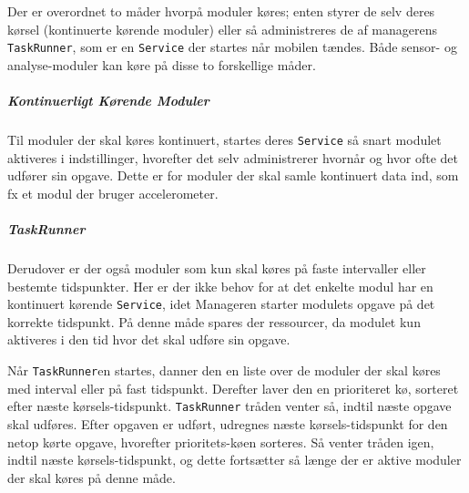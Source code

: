 Der er overordnet to måder hvorpå moduler køres; enten styrer de selv deres kørsel (kontinuerte kørende moduler) eller så administreres de af managerens \texttt{TaskRunner}, som er en \texttt{Service} der startes når mobilen tændes.
Både sensor- og analyse-moduler kan køre på disse to forskellige måder.

\subparagraph{Kontinuerligt Kørende Moduler}
Til moduler der skal køres kontinuert, startes deres \texttt{Service} så snart modulet aktiveres i indstillinger, hvorefter det selv administrerer hvornår og hvor ofte det udfører sin opgave.
Dette er for moduler der skal samle kontinuert data ind, som fx et modul der bruger accelerometer.

\subparagraph{TaskRunner}
Derudover er der også moduler som kun skal køres på faste intervaller eller bestemte tidspunkter.
Her er der ikke behov for at det enkelte modul har en kontinuert kørende \texttt{Service}, idet Manageren starter modulets opgave på det korrekte tidspunkt.
På denne måde spares der ressourcer, da modulet kun aktiveres i den tid hvor det skal udføre sin opgave. 

Når \texttt{TaskRunner}en startes, danner den en liste over de moduler der skal køres med interval eller på fast tidspunkt.
Derefter laver den en prioriteret kø, sorteret efter næste kørsels-tidspunkt.
\texttt{TaskRunner} tråden venter så, indtil næste opgave skal udføres.
Efter opgaven er udført, udregnes næste kørsels-tidspunkt for den netop kørte opgave, hvorefter prioritets-køen sorteres.
Så venter tråden igen, indtil næste kørsels-tidspunkt, og dette fortsætter så længe der er aktive moduler der skal køres på denne måde.
